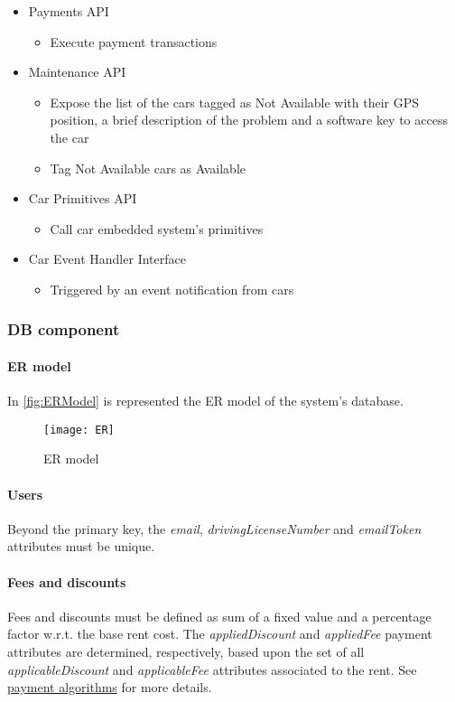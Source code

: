 \begin{itemize}
	\item Payments API
	\begin{itemize}
		\item Execute payment transactions
	\end{itemize}
	
	\item Maintenance API
	\begin{itemize}
		\item Expose the list of the cars tagged as Not Available with their GPS position, a brief description of the problem and a software key to access the car
		\item Tag Not Available cars as Available
	\end{itemize}
	
	\item Car Primitives API
	\begin{itemize}
		\item Call car embedded system's primitives
	\end{itemize}
	
	\item Car Event Handler Interface
	\begin{itemize}
		\item Triggered by an event notification from cars
	\end{itemize}
\end{itemize}
\clearpage

\subsubsection{DB component}
\paragraph{ER model}In \autoref{fig:ERModel} is represented the ER model of the system's database.

\begin{figure}[h!]
	\centering
	\texttt{[image: ER]}
	\caption{
		\label{fig:ERModel} 
		ER model
	}
\end{figure}

\paragraph{Users} Beyond the primary key, the \mbox{\emph{email}}, \mbox{\emph{drivingLicenseNumber}} and \mbox{\emph{emailToken}} attributes must be unique.

\paragraph{Fees and discounts}
Fees and discounts must be defined as sum of a fixed value and a percentage factor w.r.t. the base rent cost.
The \emph{appliedDiscount} and \emph{appliedFee} payment attributes are determined, respectively, based upon the set of all \emph{applicableDiscount} and \emph{applicableFee} attributes associated to the rent. See \hyperref[sec:paymentAlgorithms]{payment algorithms} for more details.

